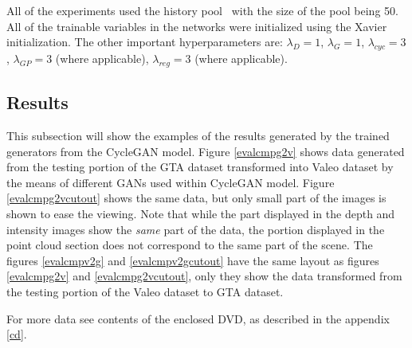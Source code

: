 All of the experiments used the history pool~\cite{historypool} with the size of the pool being 50. All of the trainable variables in the networks were initialized using the Xavier~\cite{xavier} initialization. The other important hyperparameters are: $\lambda_D = 1$, $\lambda_G = 1$, $\lambda_{cyc} = 3$, $\lambda_{GP} = 3$ (where applicable), $\lambda_{reg} = 3$ (where applicable).

\subsection{Results}

This subsection will show the examples of the results generated by the trained generators from the CycleGAN model. Figure \ref{evalcmpg2v} shows data generated from the testing portion of the GTA dataset transformed into Valeo dataset by the means of different GANs used within CycleGAN model. Figure \ref{evalcmpg2vcutout} shows the same data, but only small part of the images is shown to ease the viewing. Note that while the part displayed in the depth and intensity images show the {\em same} part of the data, the portion displayed in the point cloud section does not correspond to the same part of the scene. The figures \ref{evalcmpv2g} and \ref{evalcmpv2gcutout} have the same layout as figures \ref{evalcmpg2v} and \ref{evalcmpg2vcutout}, only they show the data transformed from the testing portion of the Valeo dataset to GTA dataset.

For more data see contents of the enclosed DVD, as described in the appendix \ref{cd}.

